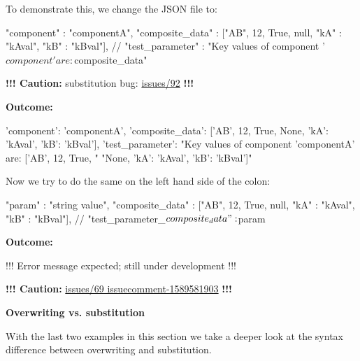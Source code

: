To demonstrate this, we change the JSON file to:

\begin{pythoncode}
{
   "component"      : "componentA",
   "composite_data" : ["AB", 12, True, null, {"kA" : "kAval", "kB" : "kBval"}],
   //
   "test_parameter" : "Key values of component '${component}' are: ${composite_data}"
}
\end{pythoncode}

\textbf{!!! Caution:} substitution bug:
\href{https://github.com/test-fullautomation/python-jsonpreprocessor/issues/92}{issues/92} \textbf{!!!}

\vspace{2ex}

\textbf{Outcome:}

\begin{pythonlog}
{'component': 'componentA',
 'composite_data': ['AB', 12, True, None, {'kA': 'kAval', 'kB': 'kBval'}],
 'test_parameter': "Key values of component 'componentA' are: ['AB', 12, True, "
                   "None, {'kA': 'kAval', 'kB': 'kBval'}]"}
\end{pythonlog}

\newpage

Now we try to do the same on the left hand side of the colon:

\begin{pythoncode}
{
   "param"          : "string value",
   "composite_data" : ["AB", 12, True, null, {"kA" : "kAval", "kB" : "kBval"}],
   //
   "test_parameter_${composite_data}" : ${param}
}
\end{pythoncode}

\vspace{2ex}

\textbf{Outcome:}

\begin{pythonlog}
!!! Error message expected; still under development !!!
\end{pythonlog}

\textbf{!!! Caution:}
\href{https://github.com/test-fullautomation/python-jsonpreprocessor/issues/69#issuecomment-1589581903}{issues/69 issuecomment-1589581903} \textbf{!!!}

\vspace{2ex}

\textbf{Overwriting vs. substitution}

\vspace{2ex}

With the last two examples in this section we take a deeper look at the syntax difference between overwriting and substitution.

